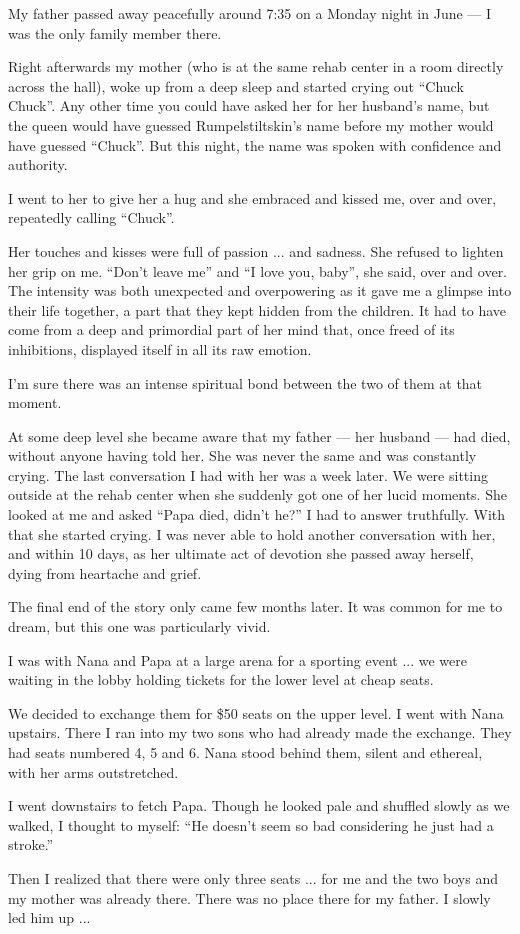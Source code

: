 My father passed away peacefully around 7:35 on a Monday night in June --- I was the only family member there.

Right afterwards my mother (who is at the same rehab center in a room directly across the hall), woke up from a deep sleep and started crying out ``Chuck Chuck''. Any other time you could have asked her for her husband's name, but the queen would have guessed Rumpelstiltskin's name before my mother would have guessed ``Chuck''. But this night, the name was spoken with confidence and authority.

I went to her to give her a hug and she embraced and kissed me, over and over, repeatedly calling ``Chuck''.

Her touches and kisses were full of passion ... and sadness. She refused to lighten her grip on me. ``Don't leave me'' and ``I love you, baby'', she said, over and over. The intensity was both unexpected and overpowering as it gave me a glimpse into their life together, a part that they kept hidden from the children. It had to have come from a deep and primordial part of her mind that, once freed of its inhibitions, displayed itself in all its raw emotion.

I'm sure there was an intense spiritual bond between the two of them at that moment.

At some deep level she became aware that my father --- her husband --- had died, without anyone having told her. She was never the same and was constantly crying. The last conversation I had with her was a week later. We were sitting outside at the rehab center when she suddenly got one of her lucid moments. She looked at me and asked ``Papa died, didn't he?'' I had to answer truthfully. With that she started crying. I was never able to hold another conversation with her, and within 10 days, as her ultimate act of devotion she passed away herself, dying from heartache and grief.

The final end of the story only came few months later. It was common for me to dream, but this one was particularly vivid.

\begin{quotationx}
I was with Nana and Papa at a large arena for a sporting event ... we were waiting in the lobby holding tickets for the lower level at cheap seats.

We decided to exchange them for \$50 seats on the upper level. I went with Nana upstairs. There I ran into my two sons who had already made the exchange. They had seats numbered 4, 5 and 6. Nana stood behind them, silent and ethereal, with her arms outstretched.

I went downstairs to fetch Papa. Though he looked pale and shuffled slowly as we walked, I thought to myself: ``He doesn't seem so bad considering he just had a stroke.''

Then I realized that there were only three seats ... for me and the two boys and my mother was already there. There was no place there for my father. I slowly led him up ... 
\end{quotationx}



